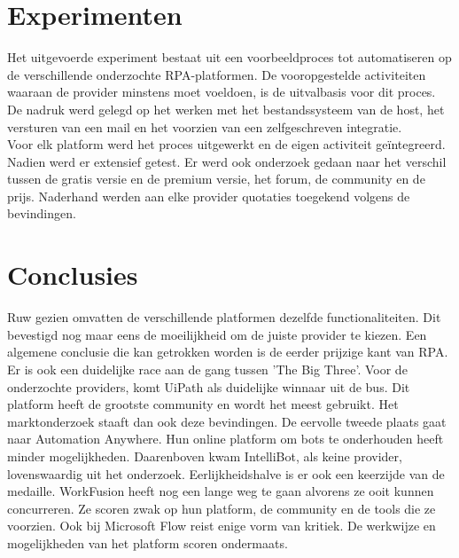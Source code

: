 \documentclass[a0,portrait]{a0poster}
\begin{document}
\begin{multicols}{2}
\section*{Experimenten}
\color{black}
Het uitgevoerde experiment bestaat uit een voorbeeldproces tot automatiseren op de verschillende onderzochte RPA-platformen. De vooropgestelde activiteiten waaraan de provider minstens moet voeldoen, is de uitvalbasis voor dit proces. De nadruk werd gelegd op het werken met het bestandssysteem van de host, het versturen van een mail en het voorzien van een zelfgeschreven integratie.\\
Voor elk platform werd het proces uitgewerkt en de eigen activiteit geïntegreerd. Nadien werd er extensief getest. Er werd ook onderzoek gedaan naar het verschil tussen de gratis versie en de premium versie, het forum, de community en de prijs. Naderhand werden aan elke provider quotaties toegekend volgens de bevindingen.

\color{HoGentAccent1} 
\section*{Conclusies}
\color{black}
Ruw gezien omvatten de verschillende platformen dezelfde functionaliteiten. Dit bevestigd nog maar eens de moeilijkheid om de juiste provider te kiezen. Een algemene conclusie die kan getrokken worden is de eerder prijzige kant van RPA. Er is ook een duidelijke race aan de gang tussen 'The Big Three'. Voor de onderzochte providers, komt UiPath als duidelijke winnaar uit de bus. Dit platform heeft de grootste community en wordt het meest gebruikt. Het marktonderzoek staaft dan ook deze bevindingen. De eervolle tweede plaats gaat naar Automation Anywhere. Hun online platform om bots te onderhouden heeft minder mogelijkheden. Daarenboven kwam IntelliBot, als keine provider, lovenswaardig uit het onderzoek. Eerlijkheidshalve is er ook een keerzijde van de medaille. WorkFusion heeft nog een lange weg te gaan alvorens ze ooit kunnen concurreren. Ze scoren zwak op hun platform, de community en de tools die ze voorzien. Ook bij Microsoft Flow reist enige vorm van kritiek. De werkwijze en mogelijkheden van het platform scoren ondermaats.

\color{HoGentAccent1} 

\end{multicols}
\end{document}
